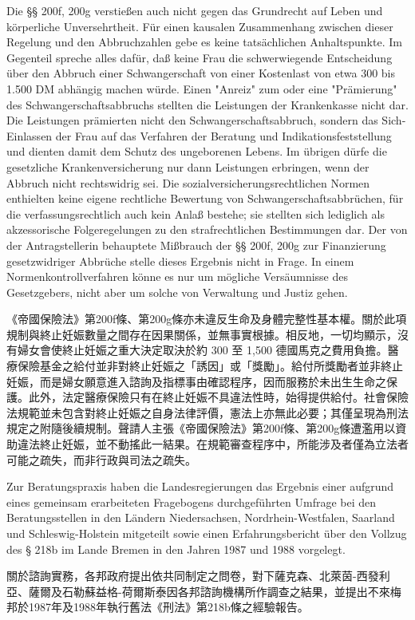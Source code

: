\documentclass[12pt]{article}
\begin{document}
\begin{sourcepara}[title={原文理由 B.II.1} Rn 103]
Die §§ 200f, 200g \abbrRVO{} verstießen auch nicht gegen das Grundrecht auf Leben und körperliche Unversehrtheit. Für einen kausalen Zusammenhang zwischen dieser Regelung und den Abbruchzahlen gebe es keine tatsächlichen Anhaltspunkte. Im Gegenteil spreche alles dafür, daß keine Frau die schwerwiegende Entscheidung über den Abbruch einer Schwangerschaft von einer Kostenlast von etwa 300 bis 1.500 DM abhängig machen würde. Einen "Anreiz" zum oder eine "Prämierung" des Schwangerschaftsabbruchs stellten die Leistungen der Krankenkasse nicht dar. Die Leistungen prämierten nicht den Schwangerschaftsabbruch, sondern das Sich-Einlassen der Frau auf das Verfahren der Beratung und Indikationsfeststellung und dienten damit dem Schutz des ungeborenen Lebens. Im übrigen dürfe die gesetzliche Krankenversicherung nur dann Leistungen erbringen, wenn der Abbruch nicht rechtswidrig sei. Die sozialversicherungsrechtlichen Normen enthielten keine eigene rechtliche Bewertung von Schwangerschaftsabbrüchen, für die verfassungsrechtlich auch kein Anlaß bestehe; sie stellten sich lediglich als akzessorische Folgeregelungen zu den strafrechtlichen Bestimmungen dar. Der von der Antragstellerin behauptete Mißbrauch der §§ 200f, 200g \abbrRVO{} zur Finanzierung gesetzwidriger Abbrüche stelle dieses Ergebnis nicht in Frage. In einem Normenkontrollverfahren könne es nur um mögliche Versäumnisse des Gesetzgebers, nicht aber um solche von Verwaltung und Justiz gehen.
\end{sourcepara}
\begin{transpara}
《帝國保險法》第200f條、第200g條亦未違反生命及身體完整性基本權。關於此項規制與終止妊娠數量之間存在因果關係，並無事實根據。相反地，一切均顯示，沒有婦女會使終止妊娠之重大決定取決於約 300 至 1,500 德國馬克之費用負擔。醫療保險基金之給付並非對終止妊娠之「誘因」或「獎勵」。給付所獎勵者並非終止妊娠，而是婦女願意進入諮詢及指標事由確認程序，因而服務於未出生生命之保護。此外，法定醫療保險只有在終止妊娠不具違法性時，始得提供給付。社會保險法規範並未包含對終止妊娠之自身法律評價，憲法上亦無此必要；其僅呈現為刑法規定之附隨後續規制。聲請人主張《帝國保險法》第200f條、第200g條遭濫用以資助違法終止妊娠，並不動搖此一結果。在規範審查程序中，所能涉及者僅為立法者可能之疏失，而非行政與司法之疏失。
\end{transpara}

\begin{sourcepara}[title={原文理由 B.II.1} Rn 104]
Zur Beratungspraxis haben die Landesregierungen das Ergebnis einer aufgrund eines gemeinsam erarbeiteten Fragebogens durchgeführten Umfrage bei den Beratungsstellen in den Ländern Niedersachsen, Nordrhein-Westfalen, Saarland und Schleswig-Holstein mitgeteilt sowie einen Erfahrungsbericht über den Vollzug des § 218b \abbrStGB{} \abbrAF{} im Lande Bremen in den Jahren 1987 und 1988 vorgelegt.
\end{sourcepara}
\begin{transpara}
關於諮詢實務，各邦政府提出依共同制定之問卷，對下薩克森、北萊茵-西發利亞、薩爾及石勒蘇益格-荷爾斯泰因各邦諮詢機構所作調查之結果，並提出不來梅邦於1987年及1988年執行舊法《刑法》第218b條之經驗報告。
\end{transpara}
\end{document}
